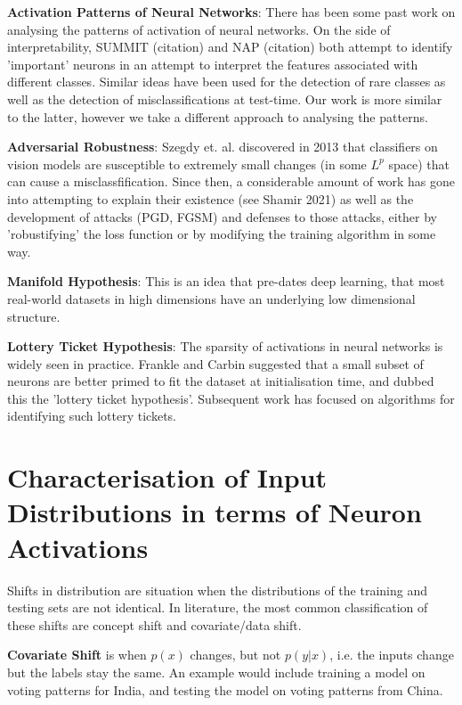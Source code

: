 \documentclass{article}
\begin{document}
            \textbf{Activation Patterns of Neural Networks}: There has been some past work on analysing the patterns of activation of neural networks. On the side of interpretability, SUMMIT (citation) and NAP (citation) both attempt to identify 'important' neurons in an attempt to interpret the features associated with different classes. Similar ideas have been used for the detection of rare classes as well as the detection of misclassifications at test-time. Our work is more similar to the latter, however we take a different approach to analysing the patterns.  

            \textbf{Adversarial Robustness}: Szegdy et. al. discovered in 2013 that classifiers on vision models are susceptible to extremely small changes (in some $L^p$ space) that can cause a misclassfification. Since then, a considerable amount of work has gone into attempting to explain their existence (see Shamir 2021) as well as the development of attacks (PGD, FGSM) and defenses to those attacks, either by 'robustifying' the loss function or by modifying the training algorithm in some way. 
            
            \textbf{Manifold Hypothesis}: This is an idea that pre-dates deep learning, that most real-world datasets in high dimensions have an underlying low dimensional structure. 

            \textbf{Lottery Ticket Hypothesis}: The sparsity of activations in neural networks is widely seen in practice. Frankle and Carbin suggested that a small subset of neurons are better primed to fit the dataset at initialisation time, and dubbed this the 'lottery ticket hypothesis'. Subsequent work has focused on algorithms for identifying such lottery tickets. 

    \section{Characterisation of Input Distributions in terms of Neuron Activations}
        Shifts in distribution are situation when the distributions of the training and testing sets are not identical. In literature, the most common classification of these shifts are concept shift and covariate/data shift.

        \textbf{Covariate Shift} is when $p(x)$ changes, but not $p(y|x)$, i.e. the inputs change but the labels stay the same. An example would include training a model on voting patterns for India, and testing the model on voting patterns from China.
        
\end{document}

